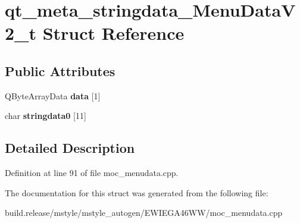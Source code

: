 \hypertarget{structqt__meta__stringdata___menu_data_v2__t}{}\section{qt\+\_\+meta\+\_\+stringdata\+\_\+\+Menu\+Data\+V2\+\_\+t Struct Reference}
\label{structqt__meta__stringdata___menu_data_v2__t}
\subsection*{Public Attributes}
\begin{DoxyCompactItemize}
\item 
\mbox{\label{structqt__meta__stringdata___menu_data_v2__t_a0b358a3a3a22863c7b15235e625c1f35}} 
Q\+Byte\+Array\+Data {\bfseries data} \mbox{[}1\mbox{]}
\item 
\mbox{\label{structqt__meta__stringdata___menu_data_v2__t_abc73693e9508a0d25fb5f227444ec955}} 
char {\bfseries stringdata0} \mbox{[}11\mbox{]}
\end{DoxyCompactItemize}


\subsection{Detailed Description}


Definition at line 91 of file moc\+\_\+menudata.\+cpp.



The documentation for this struct was generated from the following file\+:\begin{DoxyCompactItemize}
\item 
build.\+release/mstyle/mstyle\+\_\+autogen/\+E\+W\+I\+E\+G\+A46\+W\+W/moc\+\_\+menudata.\+cpp\end{DoxyCompactItemize}
